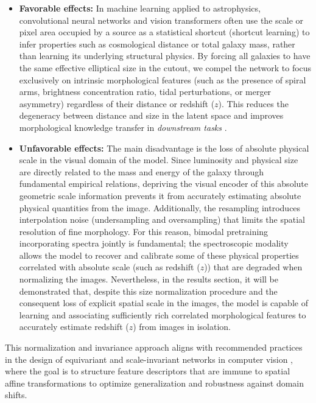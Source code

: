 \begin{itemize}
\item \textbf{Favorable effects:} In machine learning applied to astrophysics, convolutional neural networks and vision transformers often use the scale or pixel area occupied by a source as a statistical shortcut (shortcut learning) to infer properties such as cosmological distance or total galaxy mass, rather than learning its underlying structural physics. By forcing all galaxies to have the same effective elliptical size in the cutout, we compel the network to focus exclusively on intrinsic morphological features (such as the presence of spiral arms, brightness concentration ratio, tidal perturbations, or merger asymmetry) regardless of their distance or redshift ($z$). This reduces the degeneracy between distance and size in the latent space and improves morphological knowledge transfer in \textit{downstream tasks} \autocite{ar:dieleman-2015}.

\item \textbf{Unfavorable effects:} The main disadvantage is the loss of absolute physical scale in the visual domain of the model. Since luminosity and physical size are directly related to the mass and energy of the galaxy through fundamental empirical relations, depriving the visual encoder of this absolute geometric scale information prevents it from accurately estimating absolute physical quantities from the image. Additionally, the resampling introduces interpolation noise (undersampling and oversampling) that limits the spatial resolution of fine morphology. For this reason, bimodal pretraining incorporating spectra jointly is fundamental; the spectroscopic modality allows the model to recover and calibrate some of these physical properties correlated with absolute scale (such as redshift ($z$)) that are degraded when normalizing the images. Nevertheless, in the results section, it will be demonstrated that, despite this size normalization procedure and the consequent loss of explicit spatial scale in the images, the model is capable of learning and associating sufficiently rich correlated morphological features to accurately estimate redshift ($z$) from images in isolation.
\end{itemize}

This normalization and invariance approach aligns with recommended practices in the design of equivariant and scale-invariant networks in computer vision \autocite{ar:weiler-2019}, where the goal is to structure feature descriptors that are immune to spatial affine transformations to optimize generalization and robustness against domain shifts.

